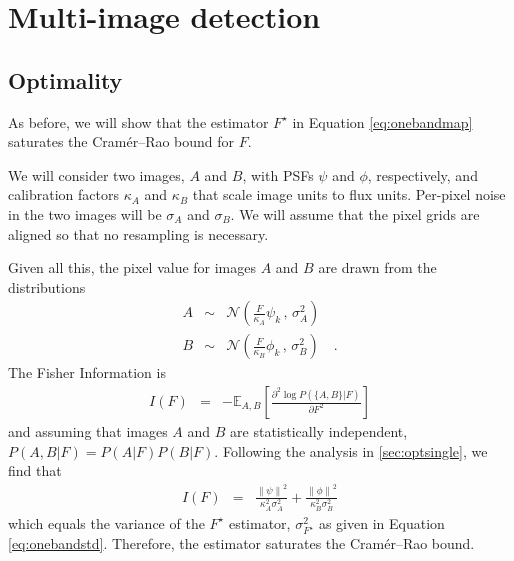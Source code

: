 \documentclass[11pt,letterpaper,linenumbers]{aastex63}
\newcommand{\drawnfrom}{\sim}
\newcommand{\gaussianN}{\mathcal{N}}
\newcommand{\gaussx}[2]{\gaussianN\!\left(#1 \, , \, #2\right)}
\newcommand{\norm}[1]{\left\lVert #1 \right\rVert}
\begin{document}
\section{Multi-image detection}
\label{app:multidet}

\subsection{Optimality}
\label{app:multiopt}
As before, we will show that the estimator $F^{\star}$ in
Equation \ref{eq:onebandmap} saturates the Cram\'er--Rao bound for $F$.

We will consider two images, $A$ and $B$, with PSFs $\psi$ and $\phi$,
respectively, and calibration factors $\kappa_A$ and $\kappa_B$ that
scale image units to flux units.  Per-pixel noise in the two images
will be $\sigma_A$ and $\sigma_B$.  We will assume that the pixel
grids are aligned so that no resampling is necessary.

Given all this, the pixel value for images $A$ and $B$ are drawn from
the distributions
\begin{eqnarray}
  A & \drawnfrom & \gaussx{\frac{F}{\kappa_A} \psi_k}{\sigma_A^2} \\
  B & \drawnfrom & \gaussx{\frac{F}{\kappa_B} \phi_k}{\sigma_B^2}
  \quad .
\end{eqnarray}
The Fisher Information is
\begin{eqnarray}
  I(F) &=& -\mathbb{E}_{A,B} \left[ \frac{\partial^2 \log P(\{ A,B \} | F)}{\partial F^2} \right]
\end{eqnarray}
and assuming that images $A$ and $B$ are statistically independent,
$P(A,B | F) = P(A|F) P(B|F)$.  Following the analysis in
\ref{sec:optsingle}, we find that
\begin{eqnarray}
  I(F) &=& \frac{\norm{\psi}^2}{\kappa_A^2 \sigma_A^2} +
  \frac{\norm{\phi}^2}{\kappa_B^2 \sigma_B^2}
\end{eqnarray}
which equals the variance of the $F^{\star}$ estimator,
$\sigma_{F^{\star}}^2$ as given in Equation \ref{eq:onebandstd}.
Therefore, the estimator saturates the Cram\'er--Rao bound.
\end{document}
